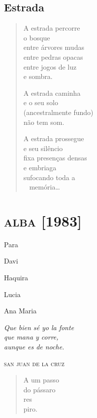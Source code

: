 \chapter{Estrada}

\begin{verse}
A estrada percorre\\
\qquad\qquad o bosque\\
entre árvores mudas\\
entre pedras opacas\\
entre jogos de luz\\
\qquad\qquad e sombra.

A estrada caminha\\
e o seu solo\\
(ancestralmente fundo)\\
não tem som.

A estrada prossegue\\
e seu silêncio\\
fixa presenças densas\\
e embriaga\\
sufocando toda a\\
\qquad\qquad\qquad\mbox{ } memória\ldots{}
\end{verse}


\part{\textsc{alba} {[}1983{]}}

\thispagestyle{empty}

\mbox{}
\vfill
Para

Davi

Haquira

Lucia

Ana Maria

\pagebreak
\thispagestyle{empty}

\mbox{}
\vfill
\setlength{\epigraphwidth}{.3\textwidth}
\epigraph{\emph{Que bien sé yo la fonte}\\
\emph{que mana y corre,}\\
\emph{aunque es de noche.}}{\textsc{san juan de la cruz}}

\pagebreak
\thispagestyle{empty}

\mbox{}\vfill
\begin{verse}
A um passo\\
do pássaro\\
res\\
piro.
\end{verse}

